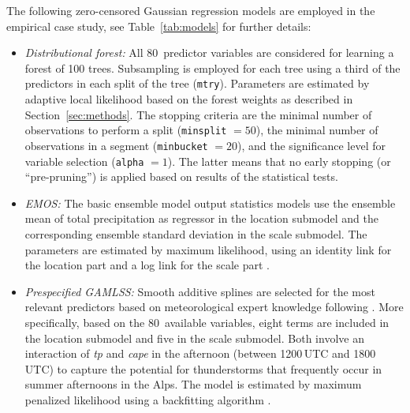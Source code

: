 \documentclass[aoas, preprint]{imsart}
\numberwithin{equation}{subsection}
\begin{document}
The following zero-censored Gaussian regression models are employed
in the empirical case study, see Table~\ref{tab:models} for
further details:
%
\begin{itemize}

\item \emph{Distributional forest:} All 80~predictor variables are
  considered for learning a forest of 100 trees. Subsampling is employed 
  for each tree using a third of the predictors
  in each split of the tree (\texttt{mtry}). Parameters are estimated by
  adaptive local likelihood based on the forest weights as described
  in Section~\ref{sec:methods}. 
  The stopping criteria are the minimal number of observations to perform a split 
  (\texttt{minsplit} $= 50$), the minimal number of observations in a 
  segment (\texttt{minbucket} $= 20$), and the significance level 
  for variable selection (\texttt{alpha} $= 1$). The latter means
  that no early stopping (or ``pre-pruning'') is applied
  based on results of the statistical tests.
  
  

\item \emph{EMOS:} The basic ensemble model output statistics
  models use the ensemble mean of total precipitation as regressor in the location
  submodel and the corresponding ensemble standard deviation in the scale submodel.
  The parameters are estimated by maximum likelihood, using an identity
  link for the location part and a log link for the scale part
  \citep[following the advice of][]{Gebetsberger+Messner+Mayr:2017}.

\item \emph{Prespecified GAMLSS:} Smooth additive splines are selected for
  the most relevant predictors based on meteorological expert knowledge
  following \cite{Stauffer+Umlauf+Messner:2017}. More specifically, based
  on the 80~available variables, eight terms are included in the location
  submodel and five in the scale submodel. Both involve an interaction of
  \emph{tp} and \emph{cape} in the afternoon (between 1200\,UTC and 1800\,UTC)
  to capture the potential for thunderstorms that frequently occur in
  summer afternoons in the Alps. The model is estimated by maximum
  penalized likelihood using a backfitting algorithm \citep{Stasinopoulos+Rigby:2007}.


\end{itemize}
\end{document}
